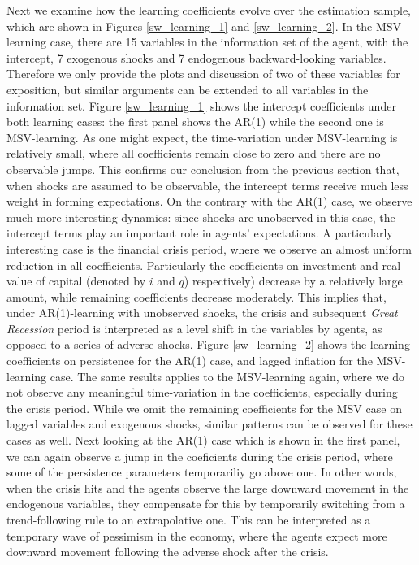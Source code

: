\documentclass[12pt,reqno]{article}
\numberwithin{equation}{section}
\begin{document}
\noindent
Next we examine how the learning coefficients evolve over the estimation sample, which are shown in Figures \ref{sw_learning_1} and \ref{sw_learning_2}. In the MSV-learning case, there are 15 variables in the information set of the agent, with the intercept, 7 exogenous shocks and 7 endogenous backward-looking variables. Therefore we only provide the plots and discussion of two of these variables for exposition, but similar arguments can be extended to all variables in the information set. Figure \ref{sw_learning_1} shows the intercept coefficients under both learning cases: the first panel shows the AR(1) while the second one is MSV-learning. As one might expect, the time-variation under MSV-learning is relatively small, where all coefficients remain close to zero and there are no observable jumps. This confirms our conclusion from the previous section that, when shocks are assumed to be observable, the intercept terms receive much less weight in forming expectations. On the contrary with the AR(1) case, we observe much more interesting dynamics: since shocks are unobserved in this case, the intercept terms play an important role in agents’ expectations. A particularly interesting case is the financial crisis period, where we observe an almost uniform reduction in all coefficients. Particularly the coefficients on investment and real value of capital (denoted by $i$ and $q$) respectively) decrease by a relatively large amount, while remaining coefficients decrease moderately. This implies that, under AR(1)-learning with unobserved shocks, the crisis and subsequent \textit{Great Recession} period is interpreted as a level shift in the variables by agents, as opposed to a series of adverse shocks. Figure \ref{sw_learning_2} shows the learning coefficients on persistence for the AR(1) case, and lagged inflation for the MSV-learning case. The same results applies to the MSV-learning again, where we do not observe any meaningful time-variation in the coefficients, especially during the crisis period. While we omit the remaining coefficients for the MSV case on lagged variables and exogenous shocks, similar patterns can be observed for these cases as well. Next looking at the AR(1) case which is shown in the first panel, we can again observe a jump in the coeficients during the crisis period, where some of the persistence parameters temporariliy go above one. In other words, when the crisis hits and the agents observe the large downward movement in the endogenous variables, they compensate for this by temporarily switching from a trend-following rule to an extrapolative one. This can be interpreted as a temporary wave of pessimism in the economy, where the agents expect more downward movement following the adverse shock after the crisis. \\
\end{document}
